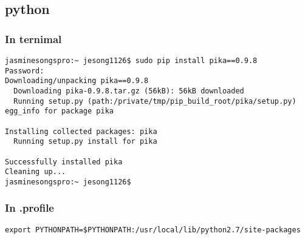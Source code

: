 \documentclass[10pt]{article}
\begin{document}
\subsection{python} 
\subsubsection{In ternimal }
\begin{verbatim} 
jasminesongspro:~ jesong1126$ sudo pip install pika==0.9.8 
Password:
Downloading/unpacking pika==0.9.8
  Downloading pika-0.9.8.tar.gz (56kB): 56kB downloaded
  Running setup.py (path:/private/tmp/pip_build_root/pika/setup.py) egg_info for package pika
    
Installing collected packages: pika
  Running setup.py install for pika
    
Successfully installed pika
Cleaning up...
jasminesongspro:~ jesong1126$ 
\end{verbatim}

\subsubsection{In .profile} 
\begin{verbatim} 
export PYTHONPATH=$PYTHONPATH:/usr/local/lib/python2.7/site-packages
\end{verbatim}

%
%
%
%
%
%
%
%
%
%
%
\end{document}
